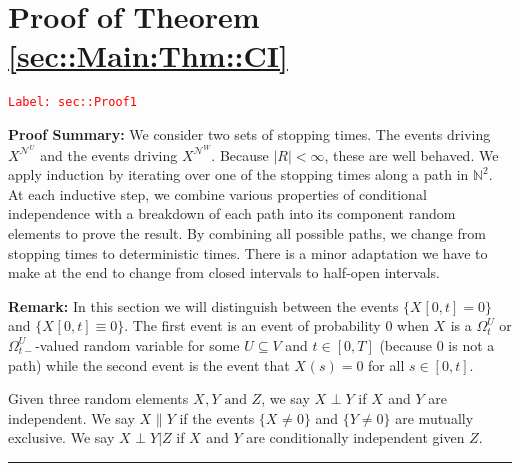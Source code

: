 \documentclass[12pt]{article}
\newcommand{\skipLine}{\vspace{12pt}}
\newcommand{\mb}{\mathbb}
\newcommand{\mc}{\mathcal}
\newcommand{\te}{\text}
\newcommand{\tr}{\textcolor{red}}
\newcommand{\labe}[1]{\tr{\texttt{Label: #1}}}
\newcommand{\pfsum}{\textbf{Proof Summary: }}
\newcommand{\ind}{\hspace{24pt}}
\newcommand{\lin}{\rule{\linewidth}{0.4 pt}}
\renewcommand{\U}{U}							%
\newcommand{\UU}{W}								%
\newcommand{\UUU}{R}							%
\newcommand{\T}{T}								%
\renewcommand{\t}{t}							%
\newcommand{\sset}{\Omega}						%
\renewcommand{\tt}{s}							%
\newcommand{\X}{X}								%
\newcommand{\neigh}{\mc{N}}						%
\newcommand{\vind}[1]{^{#1}}					%
\newcommand{\vsi}[1]{^{#1}}						%
\newcommand{\cind}[1]{_{#1}}					%
\newcommand{\tp}[1]{(#1)}						%
\newcommand{\tip}[1]{#1}						%
\newcommand{\ts}[1]{_{#1}}						%
\newcommand{\XX}{Y}								%
\newcommand{\XXX}{Z}							%
\newcommand{\mutex}{\|}							%
\begin{document}
\section{Proof of Theorem \ref{sec::Main:Thm::CI}}
\label{sec::Proof1}\labe{sec::Proof1}

\pfsum We consider two sets of stopping times. The events driving \(\X\cind{}\tip{}^{\neigh\vind{\U}}\) and the events driving \(\X\cind{}\tip{}^{\neigh\vind{\UU}}\). Because \(|\UUU| < \infty\), these are well behaved. We apply induction by iterating over one of the stopping times along a path in \(\mb{N}^2\). At each inductive step, we combine various properties of conditional independence with a breakdown of each path into its component random elements to prove the result. By combining all possible paths, we change from stopping times to deterministic times. There is a minor adaptation we have to make at the end to change from closed intervals to half-open intervals.

\skipLine

\textbf{Remark:} In this section we will distinguish between the events \(\{\X\cind{}\tip{[0,\t]} = 0\}\) and \(\{\X\cind{}\tip{[0,\t]}\equiv 0\}\). The first event is an event of probability 0 when \(\X\cind{}\tip{}\) is a \(\sset\vsi{\U}\ts{\t}\) or \(\sset\vsi{\U}\ts{\t-}\)-valued random variable for some \(\U\subseteq V\) and \(\t \in [0,\T]\) (because 0 is not a path) while the second event is the event that \(\X\cind{}\tp{\tt} = 0\) for all \(\tt \in [0,\t]\).

\ind Given three random elements \(\X\cind{}\tip{},\XX{}{} \te{ and } \XXX{}{}\), we say \(\X\cind{}\tip{}\perp \XX{}{}\) if \(\X\cind{}\tip{}\) and \(\XX{}{}\) are independent. We say \(\X\cind{}\tip{}\mutex \XX{}{}\) if the events \(\{\X\cind{}\tip{}\neq 0\}\) and \(\{\XX{}{} \neq 0\}\) are mutually exclusive. We say \(\X\cind{}\tip{}\perp \XX{}{}|\XXX{}{}\) if \(\X\cind{}\tip{}\) and \(\XX{}{}\) are conditionally independent given \(\XXX{}{}\).

\lin
\end{document}
